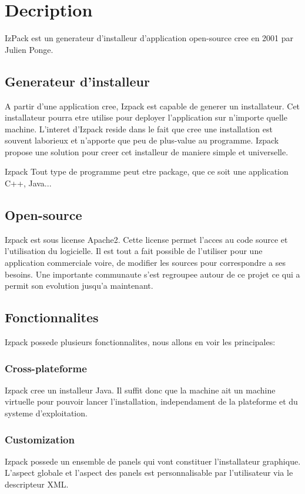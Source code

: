 \section{Decription}
IzPack est un generateur d'installeur d'application open-source cree en 2001 par Julien Ponge.
\subsection{Generateur d'installeur}
A partir d'une application cree, Izpack est capable de generer un installateur. Cet installateur pourra etre utilise pour deployer l'application sur n'importe quelle machine. L'interet d'Izpack reside dans le fait que cree une installation est souvent laborieux et n'apporte que peu de plus-value au programme. Izpack propose une solution pour creer cet installeur de maniere simple et universelle. 

Izpack 
Tout type de programme peut etre package, que ce soit une application C++, Java...
\subsection{Open-source}
Izpack est sous license Apache2. Cette license permet l'acces au code source et l'utilisation du logicielle. Il est tout a fait possible de l'utiliser pour une application commerciale voire, de modifier les sources pour correspondre a ses besoins. Une importante communaute s'est regroupee autour de ce projet ce qui a permit son evolution jusqu'a maintenant.

\subsection{Fonctionnalites}
Izpack possede plusieurs fonctionnalites, nous allons en voir les principales:
\subsubsection{Cross-plateforme}
Izpack cree un installeur Java. Il suffit donc que la machine ait un machine virtuelle pour pouvoir lancer l'installation, independament de la plateforme et du systeme d'exploitation.
\subsubsection{Customization}
Izpack possede un ensemble de panels qui vont constituer l'installateur graphique. L'aspect globale et l'aspect des panels est personnalisable par l'utilisateur via le descripteur XML.
